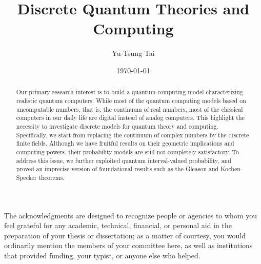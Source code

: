 \documentclass[twoside]{iuphd}
\begin{document}
\title{Discrete Quantum Theories and Computing}
\author{Yu-Tsung Tai}
\date{\today}
\maketitle

\acceptancepage



\begin{acknowledgments}
The acknowledgments are designed to recognize people or agencies to whom you feel grateful for any academic,
technical, financial, or personal aid in the preparation of your thesis or dissertation; as a matter of
courtesy, you would ordinarily mention the members of your committee here, as well as institutions that
provided funding, your typist, or anyone else who helped.
\end{acknowledgments}


\begin{abstract}
Our primary research interest is to build a quantum computing model
characterizing realistic quantum computers. While most of the quantum
computing models based on uncomputable numbers, that is, the continuum
of real numbers, most of the classical computers in our daily life
are digital instead of analog computers. This highlight the necessity
to investigate discrete models for quantum theory and computing. Specifically,
we start from replacing the continuum of complex numbers by the discrete
finite fields. Although we have fruitful results on their geometric
implications and computing powers, their probability models are still
not completely satisfactory. To address this issue, we further exploited
quantum interval-valued probability, and proved an imprecise version
of foundational results such as the Gleason and Kochen-Specker theorems. 
\end{abstract}
\tableofcontents{}
\end{document}
